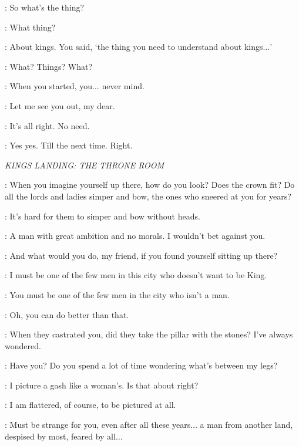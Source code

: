 \ROS: So what's the thing? 

\PYCELLE: What thing? 

\ROS: About kings. You said, `the thing you need to understand about kings$\ldots$' 

\PYCELLE: What? Things? What? 

\ROS: When you started, you$\ldots$ never mind. 

\PYCELLE: Let me see you out, my dear. 

\ROS: It's all right. No need. 


\PYCELLE: Yes yes. Till the next time. Right. 



\scene

\textit{KINGS LANDING: THE THRONE ROOM}


\VARYS: When you imagine yourself up there, how do you look? Does the crown fit? Do all the lords and ladies simper and bow, the ones who sneered at you for years? 

\LITTLEFINGER: It's hard for them to simper and bow without heads. 

\VARYS: A man with great ambition and no morals. I wouldn't bet against you. 

\LITTLEFINGER: And what would you do, my friend, if you found yourself sitting up there? 

\VARYS: I must be one of the few men in this city who doesn't want to be King. 

\LITTLEFINGER: You must be one of the few men in the city who isn't a man. 

\VARYS: Oh, you can do better than that. 

\LITTLEFINGER: When they castrated you, did they take the pillar with the stones? I've always wondered. 

\VARYS: Have you? Do you spend a lot of time wondering what's between my legs? 

\LITTLEFINGER: I picture a gash like a woman's. Is that about right? 

\VARYS: I am flattered, of course, to be pictured at all. 

\LITTLEFINGER: Must be strange for you, even after all these years$\ldots$ a man from another land, despised by most, feared by all$\ldots$  

